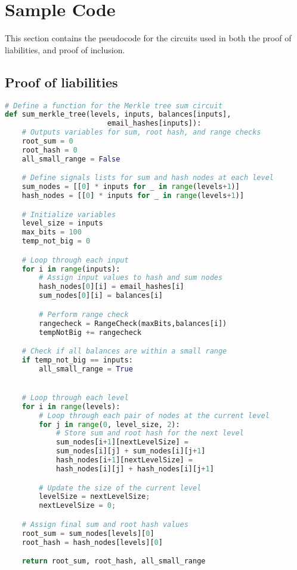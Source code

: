 
\appendix
\chapter{Sample Code}
This section contains the pseudocode for the circuits used in both the proof of liabilities, and proof of inclusion.

\section{Proof of liabilities}
\label{subsec:plc}
\begin{lstlisting}[language=Python, caption=Liabilities circuit pseudocode]
# Define a function for the Merkle tree sum circuit
def sum_merkle_tree(levels, inputs, balances[inputs], 
                        email_hashes[inputs]):
    # Outputs variables for sum, root hash, and range checks
    root_sum = 0
    root_hash = 0
    all_small_range = False

    # Define signals lists for sum and hash nodes at each level
    sum_nodes = [[0] * inputs for _ in range(levels+1)]
    hash_nodes = [[0] * inputs for _ in range(levels+1)]

    # Initialize variables
    level_size = inputs
    max_bits = 100
    temp_not_big = 0

    # Loop through each input
    for i in range(inputs):
        # Assign input values to hash and sum nodes
        hash_nodes[0][i] = email_hashes[i]
        sum_nodes[0][i] = balances[i]

        # Perform range check
        rangecheck = RangeCheck(maxBits,balances[i])
        tempNotBig += rangecheck

    # Check if all balances are within a small range
    if temp_not_big == inputs:
        all_small_range = True


    # Loop through each level
    for i in range(levels):
        # Loop through each pair of nodes at the current level
        for j in range(0, level_size, 2):
            # Store sum and root hash for the next level
            sum_nodes[i+1][nextLevelSize] = 
            sum_nodes[i][j] + sum_nodes[i][j+1]
            hash_nodes[i+1][nextLevelSize] = 
            hash_nodes[i][j] + hash_nodes[i][j+1]

        # Update the size of the current level
        levelSize = nextLevelSize;
        nextLevelSize = 0;

    # Assign final sum and root hash values
    root_sum = sum_nodes[levels][0]
    root_hash = hash_nodes[levels][0]

    return root_sum, root_hash, all_small_range

\end{lstlisting}

